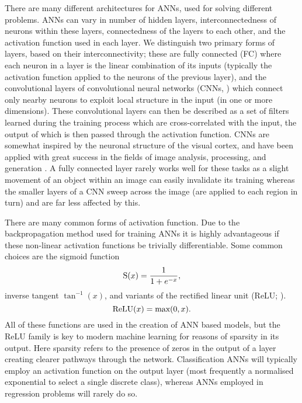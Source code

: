 There are many different architectures for ANNs, used for solving different problems.
ANNs can vary in number of hidden layers, interconnectedness of neurons within these layers, connectedness of the layers to each other, and the activation function used in each layer.
We distinguish two primary forms of layers, based on their interconnectivity; these are fully connected (FC) where each neuron in a layer is the linear combination of its inputs (typically the activation function applied to the neurons of the previous layer), and the convolutional layers of convolutional neural networks (CNNs, \citet{1998Lecun,2003Simard}) which connect only nearby neurons to exploit local structure in the input (in one or more dimensions).
These convolutional layers can then be described as a set of filters learned during the training process which are cross-correlated with the input, the output of which is then passed through the activation function.
CNNs are somewhat inspired by the neuronal structure of the visual cortex, and have been applied with great success in the fields of image analysis, processing, and generation \citep{Raschka2015}.
A fully connected layer rarely works well for these tasks as a slight movement of an object within an image can easily invalidate its training whereas the smaller layers of a CNN sweep across the image (are applied to each region in turn) and are far less affected by this.

There are many common forms of activation function.
Due to the backpropagation method used for training ANNs it is highly advantageous if these non-linear activation functions be trivially differentiable.
Some common choices are the sigmoid function
\begin{equation}
    \textnormal{S}(x) = \frac{1}{1+e^{-x}},
\end{equation}
inverse tangent $\tan^{-1}(x)$, and variants of the rectified linear unit (ReLU; \citet{2010Nair}).
\begin{equation}
    \textnormal{ReLU}(x) = \textnormal{max}(0, x).
\end{equation}
All of these functions are used in the creation of ANN based models, but the ReLU family is key to modern machine learning for reasons of sparsity in its output.
Here sparsity refers to the presence of zeros in the output of a layer creating clearer pathways through the network.
Classification ANNs will typically employ an activation function on the output layer (most frequently a normalised exponential to select a single discrete class), whereas ANNs employed in regression problems will rarely do so.

